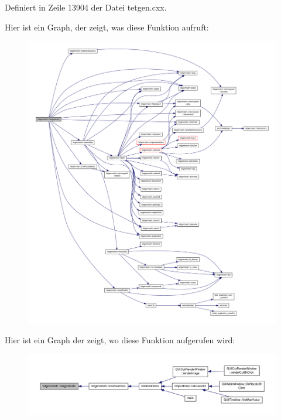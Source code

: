 Definiert in Zeile 13904 der Datei tetgen.\-cxx.



Hier ist ein Graph, der zeigt, was diese Funktion aufruft\-:
\nopagebreak
\begin{figure}[H]
\begin{center}
\leavevmode
\includegraphics[width=350pt]{classtetgenmesh_a5abff2e7fa8ae0632729d11f61c9f2a8_cgraph}
\end{center}
\end{figure}




Hier ist ein Graph der zeigt, wo diese Funktion aufgerufen wird\-:
\nopagebreak
\begin{figure}[H]
\begin{center}
\leavevmode
\includegraphics[width=350pt]{classtetgenmesh_a5abff2e7fa8ae0632729d11f61c9f2a8_icgraph}
\end{center}
\end{figure}


